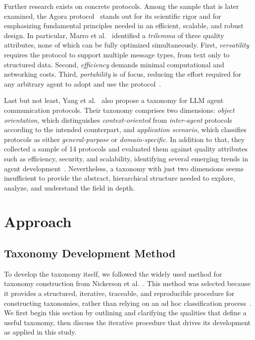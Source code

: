 \documentclass[pdflatex,sn-mathphys-num]{sn-jnl}%
\theoremstyle{thmstyleone}%
\theoremstyle{thmstyletwo}%
\theoremstyle{thmstylethree}%
\begin{document}
Further research exists on concrete protocols. Among the sample that is later examined, the Agora protocol~\cite{agoragit} stands out for its scientific rigor and for emphasizing fundamental principles needed in an efficient, scalable, and robust design. In particular, Marro et al.~\cite{marro2024scalable} identified a \textit{trilemma} of three quality attributes, none of which can be fully optimized simultaneously. First, \textit{versatility} requires the protocol to support multiple message types, from text only to structured data. Second, \textit{efficiency} demands minimal computational and networking costs. Third, \textit{portability} is of focus, reducing the effort required for any arbitrary agent to adopt and use the protocol~\cite{marro2024scalable}.

Last but not least, Yang et al.~\cite{yang2025survey} also propose a taxonomy for LLM agent communication protocols. Their taxonomy comprises two dimensions: \textit{object orientation}, which distinguishes \textit{context-oriented} from \textit{inter-agent} protocols according to the intended counterpart, and \textit{application scenario}, which classifies protocols as either \textit{general-purpose} or \textit{domain-specific}. In addition to that, they collected a sample of 14 protocols and evaluated them against quality attributes such as efficiency, security, and scalability, identifying several emerging trends in agent development~\cite{yang2025survey}. Nevertheless, a taxonomy with just two dimensions seems insufficient to provide the abstract, hierarchical structure needed to explore, analyze, and understand the field in depth.

\section{Approach}\label{sec:study-approach}
\subsection{Taxonomy Development Method}\label{sec:methodology-taxonomy}

To develop the taxonomy itself, we followed the widely used method for taxonomy construction from Nickerson et al.~\cite{nickerson2013method}. 
This method was selected because it provides a structured, iterative, traceable, and reproducible procedure for constructing taxonomies, rather than relying on an ad hoc classification process~\cite{oberlander2019taxonomy}. 
We first begin this section by outlining and clarifying the qualities that define a useful taxonomy, then discuss the iterative procedure that drives its development as applied in this study. %
\end{document}

